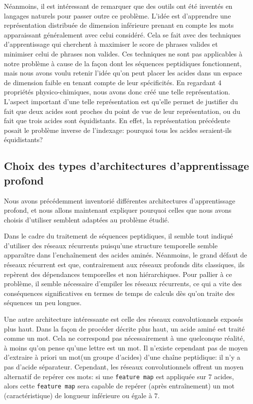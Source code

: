 \documentclass[a4paper, 11pt, onecolumn]{article}
\begin{document}
Néanmoins, il est intéressant de remarquer que des outils ont été inventés en
langages naturels pour passer outre ce problème. L'idée est d'apprendre une
représentation distribuée de dimension inférieure prenant en compte les mots
apparaissant généralement avec celui considéré. Cela se fait avec des techniques
d'apprentissage qui cherchent à maximiser le score de phrases valides et
minimiser celui de phrases non valides. Ces techniques ne sont pas applicables à
notre problème à cause de la façon dont les séquences peptidiques fonctionnent,
mais nous avons voulu retenir l'idée qu'on peut placer les acides dans un espace
de dimension faible en tenant compte de leur spécificités. En regardant 4
propriétés physico-chimiques, nous avons donc créé une telle représentation.
L'aspect important d'une telle représentation est qu'elle permet de justifier du
fait que deux acides sont proches du point de vue de leur représentation, ou du
fait que trois acides sont équidistants. En effet, la représentation précédente
posait le problème inverse de l'indexage: pourquoi tous les acides seraient-ils équidistants?

\subsection{Choix des types d'architectures d'apprentissage profond}

Nous avons précédemment inventorié différentes architectures d'apprentissage
profond, et nous allons maintenant expliquer pourquoi celles que nous avons
choisis d'utiliser semblent adaptées au problème étudié.

Dans le cadre du traitement de séquences peptidiques, il semble tout indiqué
d'utiliser des réseaux récurrents puisqu'une structure temporelle semble
apparaître dans l'enchaînement des acides aminés. Néanmoins, le grand défaut de
réseaux récurrent est que, contrairement aux réseaux profonds dits \og
classiques\fg, ils repèrent des dépendances temporelles et non hiérarchiques.
Pour pallier à ce problème, il semble nécessaire d'empiler les réseaux
récurrents, ce qui a vite des conséquences significatives en termes de temps de
calculs dès qu'on traite des séquences un peu longues.

Une autre architecture intéressante est celle des réseaux convolutionnels
exposés plus haut. Dans la façon de procéder décrite plus haut, un acide aminé
est traité comme un \og mot\fg. Cela ne correspond pas nécessairement à une
quelconque réalité, à moins qu'on pense qu'une lettre est un mot. Il n'existe
cependant pas de moyen d'extraire à priori un \og mot\fg (un groupe d'acides)
d'une chaîne peptidique: il n'y a pas d'acide \og séparateur\fg. Cependant, les
réseaux convolutionnels offrent un moyen alternatif de repérer ces mots: si une
\texttt{feature map} est appliquée sur 7 acides, alors cette \texttt{feature
  map} sera capable de repérer (après entraînement) un mot (caractéristique) de
longueur inférieure ou égale à 7.
\end{document}
